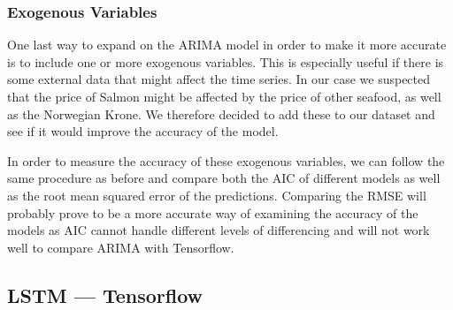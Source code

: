 \subsubsection{Exogenous Variables}
One last way to expand on the ARIMA model in order to make it more accurate is to include one or more exogenous variables. This is especially useful if there is some external data that might affect the time series. In our case we suspected that the price of Salmon might be affected by the price of other seafood, as well as the Norwegian Krone. We therefore decided to add these to our dataset and see if it would improve the accuracy of the model.

In order to measure the accuracy of these exogenous variables, we can follow the same procedure as before and compare both the AIC of different models as well as the root mean squared error of the predictions. Comparing the RMSE will probably prove to be a more accurate way of examining the accuracy of the models as AIC cannot handle different levels of differencing and will not work well to compare ARIMA with Tensorflow.~\parencite{brownlee_2017}
\subsection{LSTM --- Tensorflow}


